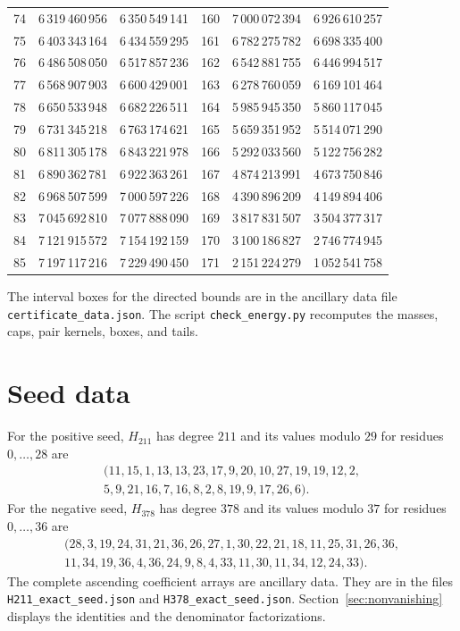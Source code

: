 \begin{longtable}{@{}r r r@{\qquad\qquad}r r r@{}}
74 & 6\,319\,460\,956 & 6\,350\,549\,141 & 160 & 7\,000\,072\,394 & 6\,926\,610\,257\\
75 & 6\,403\,343\,164 & 6\,434\,559\,295 & 161 & 6\,782\,275\,782 & 6\,698\,335\,400\\
76 & 6\,486\,508\,050 & 6\,517\,857\,236 & 162 & 6\,542\,881\,755 & 6\,446\,994\,517\\
77 & 6\,568\,907\,903 & 6\,600\,429\,001 & 163 & 6\,278\,760\,059 & 6\,169\,101\,464\\
78 & 6\,650\,533\,948 & 6\,682\,226\,511 & 164 & 5\,985\,945\,350 & 5\,860\,117\,045\\
79 & 6\,731\,345\,218 & 6\,763\,174\,621 & 165 & 5\,659\,351\,952 & 5\,514\,071\,290\\
80 & 6\,811\,305\,178 & 6\,843\,221\,978 & 166 & 5\,292\,033\,560 & 5\,122\,756\,282\\
81 & 6\,890\,362\,781 & 6\,922\,363\,261 & 167 & 4\,874\,213\,991 & 4\,673\,750\,846\\
82 & 6\,968\,507\,599 & 7\,000\,597\,226 & 168 & 4\,390\,896\,209 & 4\,149\,894\,406\\
83 & 7\,045\,692\,810 & 7\,077\,888\,090 & 169 & 3\,817\,831\,507 & 3\,504\,377\,317\\
84 & 7\,121\,915\,572 & 7\,154\,192\,159 & 170 & 3\,100\,186\,827 & 2\,746\,774\,945\\
85 & 7\,197\,117\,216 & 7\,229\,490\,450 & 171 & 2\,151\,224\,279 & 1\,052\,541\,758\\
\bottomrule
\end{longtable}
\normalsize
\noindent The interval boxes for the directed bounds are in the ancillary data
file \texttt{certificate\_data.json}.  The script
\texttt{check\_energy.py} recomputes the masses, caps, pair kernels, boxes,
and tails.
\section{Seed data}
\label{app:seed-data}
For the positive seed, $H_{211}$ has degree $211$ and its values modulo $29$ for residues $0,\ldots,28$ are
\[
 \begin{gathered}
(11, 15, 1, 13, 13, 23, 17, 9, 20, 10, 27, 19, 19, 12, 2,\\
 5, 9, 21, 16, 7, 16, 8, 2, 8, 19, 9, 17, 26, 6).
\end{gathered}
\]
For the negative seed, $H_{378}$ has degree $378$ and its values modulo $37$ for residues $0,\ldots,36$ are
\[
 \begin{gathered}
(28, 3, 19, 24, 31, 21, 36, 26, 27, 1, 30, 22, 21, 18, 11, 25, 31, 26, 36,\\
 11, 34, 19, 36, 4, 36, 24, 9, 8, 4, 33, 11, 30, 11, 34, 12, 24, 33).
\end{gathered}
\]
The complete ascending coefficient arrays are ancillary data. They are
in the files \texttt{H211\_exact\_seed.json} and
\texttt{H378\_exact\_seed.json}. Section~\ref{sec:nonvanishing} displays
the identities and the denominator factorizations.


